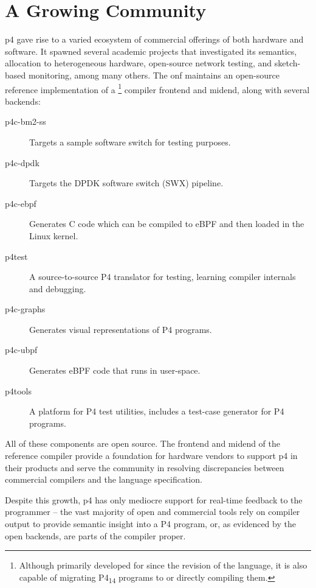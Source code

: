 \section*{A Growing Community}

\acrshort{p4} gave rise to a varied ecosystem of commercial offerings of both
hardware and software. It spawned several academic projects that investigated
its semantics\cite{doenges2021petr4}, allocation to heterogeneous
hardware\cite{sultana2021flightplan}, open-source network
testing\cite{antichi2014osnt}, and sketch-based
monitoring\cite{namkung2022sketchlib}, among many
others\cite{liatifis2023advancingp4survey}. The \acrfull{onf}
maintains\cite{p4onf} an open-source reference implementation of a
\pfs\footnote{Although primarily developed for \pfs since the revision of the
language, it is also capable of migrating P4\textsubscript{14} programs to \pfs
or directly compiling them.} compiler frontend and mid\-end, along with several
backends:

\begin{description}
  \item[p4c-bm2-ss] Targets a sample software switch for testing purposes.
  \item[p4c-dpdk] Targets the DPDK software switch (SWX) pipeline\cite{dpdkDPDKRelease}.
  \item[p4c-ebpf] Generates C code which can be compiled to eBPF
    and then loaded in the Linux kernel.
  \item[p4test] A source-to-source P4 translator for testing, learning compiler
    internals and debugging.
  \item[p4c-graphs] Generates visual representations of P4 programs.
  \item[p4c-ubpf] Generates eBPF code that runs in user-space.
  \item[p4tools] A platform for P4 test utilities, includes a test-case
    generator for P4 programs.
\end{description}

All of these components are open source. The frontend and mid\-end of the
reference compiler provide a foundation for hardware vendors to support
\acrshort{p4} in their products and serve the community in resolving
discrepancies between commercial compilers and the language specification.

Despite this growth, \acrshort{p4} has only mediocre support for real-time
feedback to the programmer -- the vast majority of open and commercial tools
rely on compiler output to provide semantic insight into a P4
program\cite{p4insight}, or, as evidenced by the open backends, are parts of the
compiler proper.

